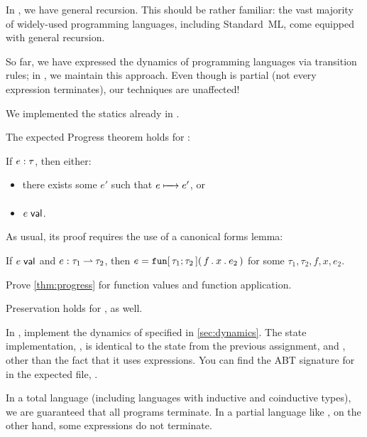 \documentclass[11pt]{article}
\begin{document}
In \LangPCF{}, we have general recursion.
This should be rather familiar: the vast majority of widely-used programming languages, including Standard~ML, come equipped with general recursion.

So far, we have expressed the dynamics of programming languages via transition rules; in \LangPCF{}, we maintain this approach.
Even though \LangPCF{} is partial (not every expression terminates), our techniques are unaffected!

We implemented the statics already in .

The expected Progress theorem holds for \LangPCF{}:
\begin{theorem}[Progress]\label{thm:progress}
  If ${e}\mathrel{:}{\tau}$, then either:
  \begin{itemize}
    \item there exists some $e'$ such that $e \xmapsto[\,\,]{\hspace*{1em}} e'$, or
    \item ${e}\;{\textsf{val}_{}}$.
  \end{itemize}
\end{theorem}
As usual, its proof requires the use of a canonical forms lemma:
\begin{lemma}
  If ${e}\;{\textsf{val}_{}}$ and ${e}\mathrel{:}{{\tau_1}\mathbin{\rightharpoonup}{\tau_2}}$, then $e = {\mathtt{fun}}\mathtt{[}\,{\tau_1;\tau_2}\,\mathtt{]}\mathtt{(}\,{f}\mathbin{\mathtt{.}}{{x}\mathbin{\mathtt{.}}{e_2}}\,\mathtt{)}$ for some $\tau_1, \tau_2, f, x, e_2$.
\end{lemma}
\begin{task}{10}
  Prove \cref{thm:progress} for function values and function application.
\end{task}

Preservation holds for \LangPCF{}, as well.

\begin{task}{10}
  In , implement the dynamics of \LangPCF{} specified in \cref{sec:dynamics}.
  The state implementation, , is identical to the state from the previous assignment,  and , other than the fact that it uses \LangPCF{} expressions.
  You can find the ABT signature for \LangPCF{} in the expected file, .
\end{task}

In a total language (including languages with inductive and coinductive types), we are guaranteed that all programs terminate.
In a partial language like \LangPCF{}, on the other hand, some expressions do not terminate.
\end{document}

